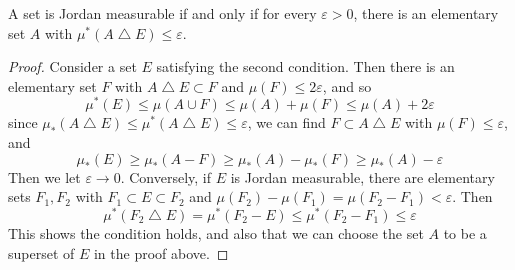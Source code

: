 \begin{theorem}
    A set is Jordan measurable if and only if for every $\varepsilon > 0$, there is an elementary set $A$ with $\mu^*(A \bigtriangleup E) \leq \varepsilon$.
\end{theorem}
\begin{proof}
    Consider a set $E$ satisfying the second condition. Then there is an elementary set $F$ with $A \bigtriangleup E \subset F$ and $\mu(F) \leq 2\varepsilon$, and so
    \[ \mu^*(E) \leq \mu(A \cup F) \leq \mu(A) + \mu(F) \leq \mu(A) + 2\varepsilon \]
    since $\mu_*(A \bigtriangleup E) \leq \mu^*(A \bigtriangleup E) \leq \varepsilon$, we can find $F \subset A \bigtriangleup E$ with $\mu(F) \leq \varepsilon$, and
    \[ \mu_*(E) \geq \mu_*(A - F) \geq \mu_*(A) - \mu_*(F) \geq \mu_*(A) - \varepsilon \]
    Then we let $\varepsilon \to 0$. Conversely, if $E$ is Jordan measurable, there are elementary sets $F_1, F_2$ with $F_1 \subset E \subset F_2$ and $\mu(F_2) - \mu(F_1) = \mu(F_2 - F_1) < \varepsilon$. Then
    \[ \mu^*(F_2 \bigtriangleup E) = \mu^*(F_2 - E) \leq \mu^*(F_2 - F_1) \leq \varepsilon \]
    This shows the condition holds, and also that we can choose the set $A$ to be a superset of $E$ in the proof above.
\end{proof}

